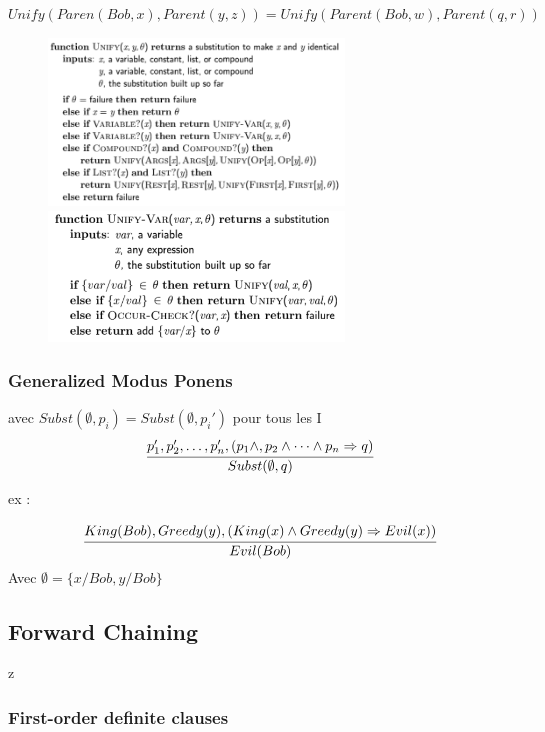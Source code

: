 			$Unify(Paren(Bob,x), Parent(y,z)) = Unify(Parent(Bob,w), Parent(q,r))$
		
			\begin{figure}[htp]	
				\centering
				\includegraphics[width=0.7\textwidth]{img/Unification.png}
				\includegraphics[width=0.7\textwidth]{img/Unification1.png}
			\end{figure}
			
		\subsubsection{Generalized Modus Ponens}
			avec $Subst(\emptyset, p_i) = Subst(\emptyset,p_i')$ pour tous les I
			\begin{equation}
				\cfrac{p_1', p_2',\dots,p_n',(p_1 \land,p_2 \land \dots \land p_n \Rightarrow q)}{Subst(\emptyset, q)}
			\end{equation}
			
			ex :
			
			\begin{equation}
			\cfrac{King(Bob), Greedy(y), (King(x) \land Greedy(y) \Rightarrow Evil(x))}{Evil(Bob)}
			\end{equation}
			Avec $\emptyset = \{x/Bob, y/Bob\}$	
			
	\subsection{Forward Chaining}z
		\subsubsection{First-order definite clauses}


